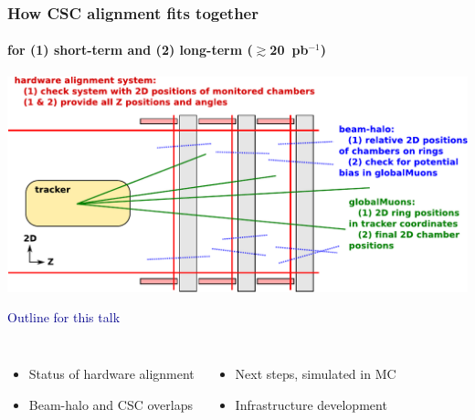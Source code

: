 \documentclass[compress]{beamer}
\begin{document}
\begin{frame}
\frametitle{How CSC alignment fits together}
\framesubtitle{for (1) short-term and (2) long-term ($\gtrsim$20~pb$^{-1}$)}

\vspace{0.5 cm}

\includegraphics[width=\linewidth]{timeline.pdf}

\vspace{0.5 cm}

\hspace{-0.83 cm} \textcolor{darkblue}{\Large Outline for this talk}
\begin{columns}
\begin{itemize}
\item Status of hardware alignment

\item Beam-halo and CSC overlaps
\end{itemize}

\begin{itemize}
\item Next steps, simulated in MC

\item Infrastructure development
\end{itemize}
\end{columns}
\end{frame}
\end{document}
